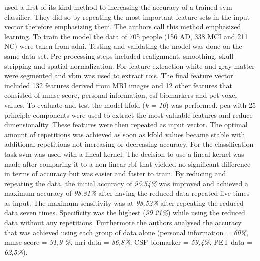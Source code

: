 \textcite{akramifardEmphasisLearningFeatures2020} used a first of its kind method to increasing the accuracy of a trained \gls{svm} classifier. They did so by repeating the most important feature sets in the input vector therefore emphasizing them. The authors call this method emphasized learning. 
To train the model the data of 705 people (156 AD, 338 MCI and 211 NC) were taken from \gls{adni}. Testing and validating the model was done on the same data set. Pre-processing steps included realignment, smoothing, skull-stripping and spatial normalization. For feature extraction white and gray matter were segmented and \gls{vbm} was used to extract \gls{roi}s. The final feature vector included 132 features derived from \gls{MRI} images and 12 other features that consisted of \gls{mmse} score, personal information, \gls{csf} biomarkers and \gls{pet} voxel values. To evaluate and test the model \gls{kfold} (\textit{k = 10}) was performed. \gls{pca} with 25 principle components were used to extract the most valuable features and reduce dimensionality. These features were then repeated as input vector.  
The optimal amount of repetitions was achieved as soon as \gls{kfold} values became stable with additional repetitions not increasing or decreasing accuracy. For the classification task \gls{svm} was used with a lineal kernel. The decision to use a lineal kernel was made after comparing it to a non-linear \gls{rbf} that yielded no significant difference in terms of accuracy but was easier and faster to train. By reducing and repeating the data, the initial accuracy of \textit{95.54\%} was improved and achieved a maximum accuracy of \textit{98.81\%} after having the reduced data repeated five times as input. The maximum sensitivity was at \textit{98.52\%} after repeating the reduced data seven times. Specificity was the highest (\textit{99.21\%}) while using the reduced data without any repetitions. Furthermore the authors analysed the accuracy that was achieved using each group of data alone (personal information = \textit{60\%}, \gls{mmse} score = \textit{91,9 \%}, \gls{mri} data = \textit{86,8\%}, CSF biomarker = \textit{59,4\%}, PET data = \textit{62,5\%}).




